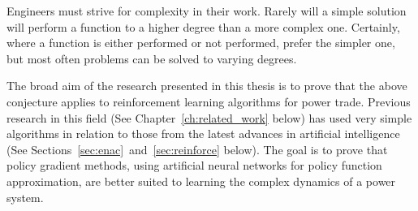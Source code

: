 
Engineers must strive for complexity in their work.  Rarely will a simple
solution will perform a function to a higher degree than a more complex one.
Certainly, where a function is either performed or not performed, prefer the
simpler one, but most often problems can be solved to varying degrees.

The broad aim of the research presented in this thesis is to prove that the
above conjecture applies to reinforcement learning algorithms for power trade.
Previous research in this field (See Chapter~\ref{ch:related_work} below) has
used very simple algorithms in relation to those from the latest advances in
artificial intelligence (See Sections~\ref{sec:enac}~and~\ref{sec:reinforce}
below).  The goal is to prove that policy gradient methods, using artificial
neural networks for policy function approximation, are better suited to
learning the complex dynamics of a power system.

